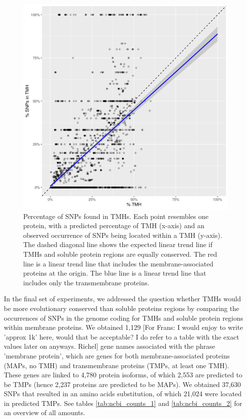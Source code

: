 \begin{figure}[!htbp]
  \includegraphics[width=\textwidth]{ncbi_peregrine_results/fig_f_snps_found_and_expected.png}
  \caption{
    Percentage of SNPs found in TMHs.
    Each point resembles one protein, with a predicted percentage of
    TMH (x-axis) and an observed occurrence of SNPs being located
    within a TMH (y-axis).
    The dashed diagonal line shows the expected linear trend line
    if TMHs and soluble protein regions are equally conserved.
    The red line is a linear trend line that includes the membrane-associated
    proteins at the origin. 
    The blue line is a linear trend line that includes only the
    transmembrane proteins.
  }
  \label{fig:f_snps_found_and_expected}
\end{figure}

In the final set of experiments, 
we addressed the question whether TMHs 
would be more evolutionary conserved than soluble proteins regions 
by comparing the occurrences of SNPs in the genome coding 
for TMHs and soluble protein regions within membrane proteins.
We obtained 1,129 [For Frans: I would enjoy to write 'approx 1k' here, would that
be acceptable? I do refer to a table with the exact values
later on anyways. Richel] gene names associated with the phrase 'membrane protein',
which are genes for both membrane-associated proteins (MAPs, no TMH) and 
transmembrane proteins (TMPs, at least one TMH).
These genes are linked to 4,780 protein isoforms, 
of which 2,553 are predicted to be TMPs (hence 
2,237 proteins are predicted to be MAPs).
We obtained 37,630 SNPs that resulted in an
amino acids substitution, of which 21,024 were located 
in predicted TMPs.
See tables \ref{tab:ncbi_counts_1} and \ref{tab:ncbi_counts_2} 
for an overview of all amounts.

